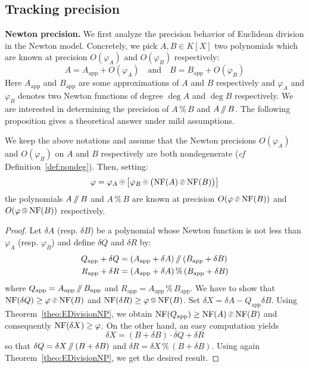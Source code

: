 \documentclass{sig-alternate-05-2015}
\newcommand{\NF}{\text{\rm NF}}
\renewcommand{\mod}{\,\%\,}
\renewcommand{\div}{\,/\hspace{-0.3em}/\,}
\newcommand{\nfop}[1]{%
\raisebox{-0.1mm}{\begin{tikzpicture}
\draw[transparent] (-0.18,0)--(0.18,0);
\draw[very thin] (0,0) circle (0.11cm);
\begin{scope}
\clip (0,0) circle (0.11cm);
\node[scale=0.75] at (0,0) { $#1$ };
\end{scope}
\end{tikzpicture}}}
\newcommand{\nfplus}{\nfop+}
\newcommand{\nftimes}{\nfop\times}
\newcommand{\nfmod}{\nfop\mod}
\newcommand{\nfdiv}{\nfop\div}
\newcommand{\app}{\textrm{app}}
\begin{document}
\subsection{Tracking precision} \label{sec:prec_track}

\medskip

\noindent
{\bf Newton precision.}
We first analyze the precision behavior of Euclidean division
in the Newton model.  Concretely, we pick $A, B \in K[X]$ two polynomials which 
are known at precision $O(\varphi_A)$ and $O(\varphi_B)$ respectively:
$$A = A_\app + O(\varphi_A)
\quad \text{and} \quad
B = B_\app + O(\varphi_B)$$
Here $A_\app$ and $B_\app$ are some approximations of $A$ and $B$ respectively 
and $\varphi_A$ and $\varphi_B$ denotes two Newton functions of degree 
$\deg A$ and $\deg B$ respectively.
We are interested in determining the precision of $A \mod B$ and $A
\div B$. The following proposition gives a theoretical answer under
mild assumptions.

\begin{prop}
\label{prop:NewtonprecEuclide}
We keep the above notations and assume that the Newton precisions
$O(\varphi_A)$ and $O(\varphi_B)$ on $A$ and $B$ respectively are 
both nondegenerate (\emph{cf} Definition~\ref{def:nondeg}). Then,
setting:
$$\varphi = \varphi_A \nfplus 
\big[ \varphi_B \nftimes \big(\NF(A) \nfdiv \NF(B)\big) \big]$$
the polynomials $A \div B$ and $A \mod B$ are known at precision 
$O(\varphi \nfdiv \NF(B))$ and $O(\varphi \nfmod \NF(B))$ respectively.
\end{prop}

\begin{proof}
Let $\delta A$ (resp. $\delta B$) be a polynomial whose Newton 
function is not less than $\varphi_A$ (resp. $\varphi_B$) and define
$\delta Q$ and $\delta R$ by:
\begin{align*}
Q_\app + \delta Q & = (A_\app + \delta A) \div (B_\app + \delta B) \\
R_\app + \delta R & = (A_\app + \delta A) \mod (B_\app + \delta B)
\end{align*}
where $Q_\app = A_\app \div B_\app$ and $R_\app = A_\app \mod B_\app$.
We have to show that $\NF(\delta Q) \geq \varphi \nfdiv \NF(B)$ and
$\NF(\delta R) \geq \varphi \nfmod \NF(B)$.
Set $\delta X = \delta A - Q_\app \delta B$. 
Using Theorem~\ref{theo:EDivisionNP}, we obtain $\NF(Q_\app) \geq
\NF(A) \nfdiv \NF(B)$ and consequently $\NF(\delta X) \geq \varphi$.
On the other hand, an easy computation yields
$$\delta X = (B + \delta B) \cdot \delta Q + \delta R$$
so that $\delta Q = \delta X \div (B + \delta B)$ and 
$\delta R = \delta X \mod (B + \delta B)$. Using again 
Theorem~\ref{theo:EDivisionNP}, we get the desired result.
\end{proof}
\end{document}
